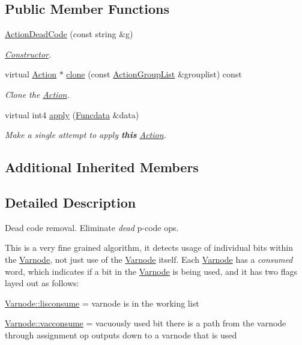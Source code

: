 \subsection*{Public Member Functions}
\begin{DoxyCompactItemize}
\item 
\mbox{\hyperlink{class_action_dead_code_a82b4ed28ec16668d34478c4859cd3845}{Action\+Dead\+Code}} (const string \&g)
\begin{DoxyCompactList}\small\item\em \mbox{\hyperlink{class_constructor}{Constructor}}. \end{DoxyCompactList}\item 
virtual \mbox{\hyperlink{class_action}{Action}} $\ast$ \mbox{\hyperlink{class_action_dead_code_a2c1a4dac2eab0a2a6979c073def75fc3}{clone}} (const \mbox{\hyperlink{class_action_group_list}{Action\+Group\+List}} \&grouplist) const
\begin{DoxyCompactList}\small\item\em Clone the \mbox{\hyperlink{class_action}{Action}}. \end{DoxyCompactList}\item 
virtual int4 \mbox{\hyperlink{class_action_dead_code_a8fc0f3220ac7b0fef4613ba3666d9af9}{apply}} (\mbox{\hyperlink{class_funcdata}{Funcdata}} \&data)
\begin{DoxyCompactList}\small\item\em Make a single attempt to apply {\bfseries{this}} \mbox{\hyperlink{class_action}{Action}}. \end{DoxyCompactList}\end{DoxyCompactItemize}
\subsection*{Additional Inherited Members}


\subsection{Detailed Description}
Dead code removal. Eliminate {\itshape dead} p-\/code ops. 

This is a very fine grained algorithm, it detects usage of individual bits within the \mbox{\hyperlink{class_varnode}{Varnode}}, not just use of the \mbox{\hyperlink{class_varnode}{Varnode}} itself. Each \mbox{\hyperlink{class_varnode}{Varnode}} has a {\itshape consumed} word, which indicates if a bit in the \mbox{\hyperlink{class_varnode}{Varnode}} is being used, and it has two flags layed out as follows\+:
\begin{DoxyItemize}
\item \mbox{\hyperlink{class_varnode_a54e5d14b3fc1c7916863ba2a2d7ee900a623c7c3682639480ce5868861b9f8be8}{Varnode\+::lisconsume}} = varnode is in the working list
\item \mbox{\hyperlink{class_varnode_a54e5d14b3fc1c7916863ba2a2d7ee900aaaa10f65253aaec3d24b78d7bc342d64}{Varnode\+::vacconsume}} = vacuously used bit there is a path from the varnode through assignment op outputs down to a varnode that is used
\end{DoxyItemize}

